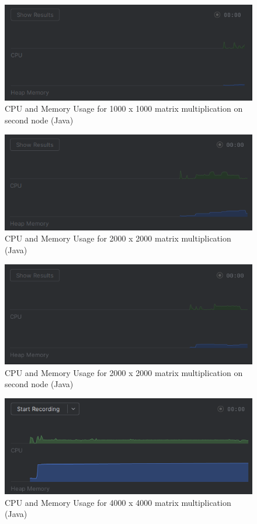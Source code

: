 \documentclass{article}
\begin{document}
\begin{figure}[H]
    \centering
    \includegraphics[width=\textwidth]{1000_java_plot_1.png}
    \caption{CPU and Memory Usage for 1000 x 1000 matrix multiplication on second node (Java)}
\end{figure}

\begin{figure}[H]
    \centering
    \includegraphics[width=\textwidth]{2000_java_plot.png}
    \caption{CPU and Memory Usage for 2000 x 2000 matrix multiplication (Java)}
\end{figure}

\begin{figure}[H]
    \centering
    \includegraphics[width=\textwidth]{2000_java_plot_1.png}
    \caption{CPU and Memory Usage for 2000 x 2000 matrix multiplication on second node (Java)}
\end{figure}

\begin{figure}[H]
    \centering
    \includegraphics[width=\textwidth]{4000_java_plot.png}
    \caption{CPU and Memory Usage for 4000 x 4000 matrix multiplication (Java)}
\end{figure}
\end{document}
